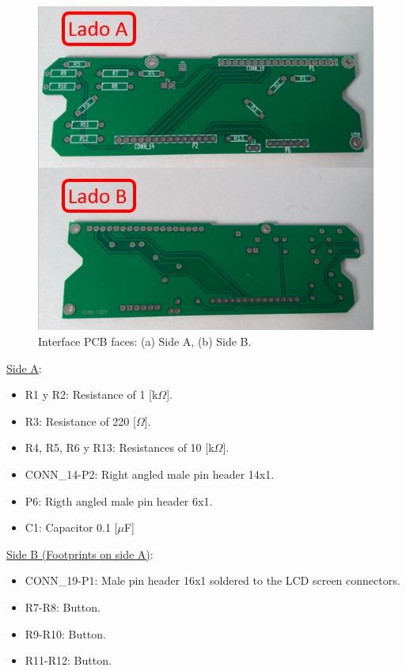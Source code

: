 \documentclass[12pt,letterpaper]{article}
\numberwithin{figure}{section}
\numberwithin{equation}{section}
\numberwithin{table}{section}
\begin{document}
\begin{figure}[H]
    \centering
    \includegraphics[scale=0.5]{Figuras/figure_8.jpg}
    \caption{Interface PCB faces: (a) Side A, (b) Side B.}
    \label{fig:8}
\end{figure}

\underline{Side A}:

\begin{itemize}
    \item R1 y R2: Resistance of 1 [k$\Omega$].
    \item R3: Resistance of 220 [$\Omega$].
    \item R4, R5, R6 y R13: Resistances of 10 [k$\Omega$].
    \item CONN\_14-P2: Right angled male pin header 14x1.
    \item P6: Rigth angled male pin header 6x1.
    \item C1: Capacitor 0.1 [$\mu$F]
\end{itemize}

\underline{Side B (Footprints on side A)}:

\begin{itemize}
    \item CONN\_19-P1: Male pin header 16x1 soldered to the LCD screen connectors.
    \item R7-R8: Button.
    \item R9-R10: Button.
    \item R11-R12: Button.
\end{itemize}
\end{document}
